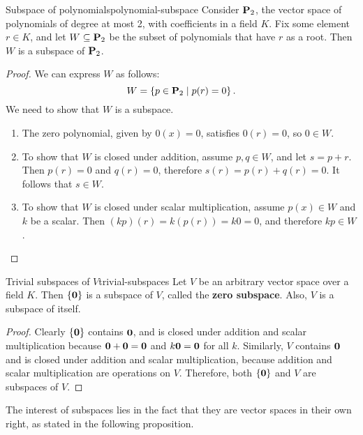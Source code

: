 \begin{example}{Subspace of polynomials}{polynomial-subspace}
  Consider $\mathbf{P}_2$, the vector space of polynomials of degree at
  most 2, with coefficients in a field $K$. Fix some element $r\in K$,
  and let $W \subseteq \mathbf{P}_2$ be the subset of polynomials that have
  $r$ as a root. Then $W$ is a subspace of $\mathbf{P}_2$.
\end{example}

\begin{proof}
  We can express $W$ as follows:
  \begin{equation*}
    W = \left\{p\in\mathbf{P}_2 \mid p(r)  = 0\right\}.
  \end{equation*}
  We need to show that $W$ is a subspace.
  \begin{enumerate}
  \item The zero polynomial, given by $0(x)=0$, satisfies $0(r)=0$, so
    $0\in W$.
  \item To show that $W$ is closed under addition, assume
    $p, q\in W$, and let $s=p+r$. Then $p(r)=0$ and $q(r)=0$,
    therefore $s(r) = p(r)+q(r) = 0$. It follows that $s\in W$.
  \item To show that $W$ is closed under scalar multiplication, assume
    $p(x)\in W$ and $k$ be a scalar. Then $(kp)(r)=k(p(r))=k0=0$, and
    therefore $kp\in W$.
  \end{enumerate}
\end{proof}

\begin{example}{Trivial subspaces of\/ $V$}{trivial-subspaces}
  Let $V$ be an arbitrary vector space over a field $K$. Then
  $\left\{\mbox{\bf 0}\right\}$ is a subspace of\/ $V$, called the \textbf{zero
    subspace}. Also, $V$ is a subspace of itself.
\end{example}

\begin{proof}
  Clearly $\left\{\mbox{\bf 0}\right\}$ contains $\mbox{\bf 0}$, and is closed under
  addition and scalar multiplication because
  $\mbox{\bf 0}+\mbox{\bf 0}=\mbox{\bf 0}$ and $k\mbox{\bf 0}=\mbox{\bf 0}$ for all $k$.
  Similarly, $V$ contains $\mbox{\bf 0}$ and is closed under addition and
  scalar multiplication, because addition and scalar multiplication
  are operations on $V$.  Therefore, both $\left\{\mbox{\bf 0}\right\}$ and $V$ are
  subspaces of\/ $V$.
\end{proof}

The interest of subspaces lies in the fact that they are vector spaces
in their own right, as stated in the following proposition.


